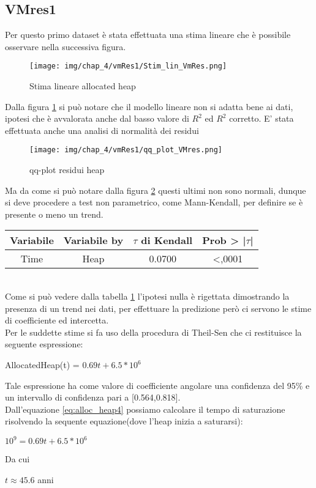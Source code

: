 \subsection{VMres1}
Per questo primo dataset è stata effettuata una stima lineare che è possibile osservare nella successiva figura.
\begin{figure}[H]
    \centering
    \texttt{[image: img/chap\_4/vmRes1/Stim\_lin\_VmRes.png]}
    \caption{Stima lineare allocated heap}
    \label{fig:stim_lin_VmRes11}
\end{figure}
\noindent
Dalla figura \ref{fig:stim_lin_VmRes11} si può notare che il modello lineare non si adatta bene ai dati, ipotesi che è avvalorata anche dal basso valore di $R^2$ ed $R^2$ corretto.
E' stata effettuata anche una analisi di normalità dei residui
\begin{figure}[H]
    \centering
    \texttt{[image: img/chap\_4/vmRes1/qq\_plot\_VMres.png]}
    \caption{qq-plot residui heap}
    \label{fig:qq_plot_VmRes12}
\end{figure}
Ma da come si può notare dalla figura \ref{fig:qq_plot_VmRes12} questi ultimi non sono normali, dunque si deve procedere a test non parametrico, come Mann-Kendall, per definire se è presente o meno un trend.\\
\begin{table}[htbp]
    \centering
    \label{tab:Mann-kendall4}
    \begin{tabular}{|c|c|c|c|} %
        \hline
        Variabile & Variabile by & $\tau$ di Kendall &Prob > |$\tau$| \\ %
        \hline
        Time & Heap & 0.0700 & <,0001\\
        \hline
    \end{tabular}
\end{table}
\\
Come si può vedere dalla tabella \ref{tab:Mann-kendall4} l'ipotesi nulla è rigettata dimostrando la presenza di un trend nei dati, per effettuare la predizione però ci servono le stime di coefficiente ed intercetta.\\
Per le suddette stime si fa uso della procedura di Theil-Sen che ci restituisce la seguente espressione:
\begin{center}
   AllocatedHeap(t) = $0.69t + 6.5*10^6$
   \label{eq:alloc_heap4}
\end{center}
Tale espressione ha come valore di coefficiente angolare una confidenza del 95\% e un intervallo di confidenza pari a [0.564,0.818].\\
Dall'equazione \ref{eq:alloc_heap4} possiamo calcolare il tempo di saturazione risolvendo la sequente equazione(dove l'heap inizia a saturarsi):
\begin{center}
    $
    10^9 = 0.69t+6.5*10^6
    $\\
\end{center}
Da cui 
\begin{center}
    $
    t \approx 45.6$ anni
\end{center}
\newpage
